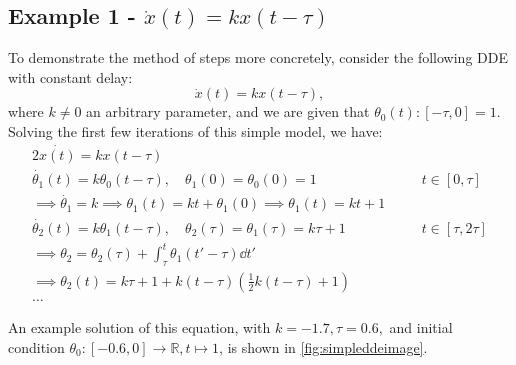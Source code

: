 \documentclass[12pt]{article}
\begin{document}
\subsection{Example 1 - $\dot{x}(t) = kx(t - \tau)$}

To demonstrate the method of steps more concretely, consider the following DDE with constant delay: \begin{equation}
    \dot{x}(t) = kx(t- \tau),
\end{equation}
where $k \neq 0$ an arbitrary parameter, and we are given that $\theta_0(t):[-\tau, 0] = 1$. Solving the first few iterations of this simple model, we have:
\begin{alignat}{2}
    \dot{x(t)} = kx(t-\tau) && \\
    \dot{\theta_1}(t) = k \theta_0(t-\tau), \quad \theta_1(0) = \theta_0(0) = 1 && \quad t \in [0, \tau]\\
    \implies \dot{\theta_1} = k \implies \theta_1(t) = kt + \theta_1(0) \implies \theta_1(t)= kt + 1\\
    \dot{\theta_2}(t) = k \theta_1(t - \tau), \quad \theta_2(\tau) =\theta_1(\tau) = k \tau + 1 && \quad t \in [\tau, 2\tau]\\
    \implies \theta_2 = \theta_2(\tau) + \int_{\tau}^{t} \theta_1(t' - \tau) \dd{t'}\\
    \implies \theta_2(t) = k\tau + 1 +k(t - \tau)(\frac{1}{2}k(t - \tau) + 1)\\
    \dots
\end{alignat}

An example solution of this equation, with $k = -1.7, \tau = 0.6,$ and initial condition $\theta_0:[-0.6, 0] \to \mathbb{R}, t \mapsto 1$, is shown in \cref{fig:simpleddeimage}.
\end{document}
